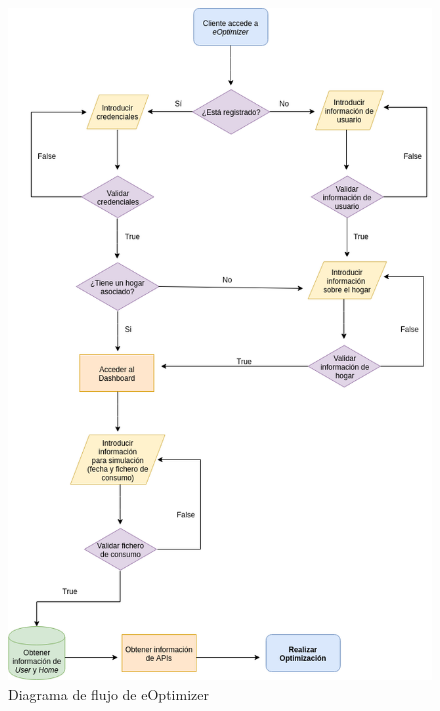 \begin{figure}[H]
            \centering
            \includegraphics[width=15cm]{figs/diagrama_flujo.png}
            \caption{Diagrama de flujo de eOptimizer}
            \label{fig:diagrama-flujo}
\end{figure}

